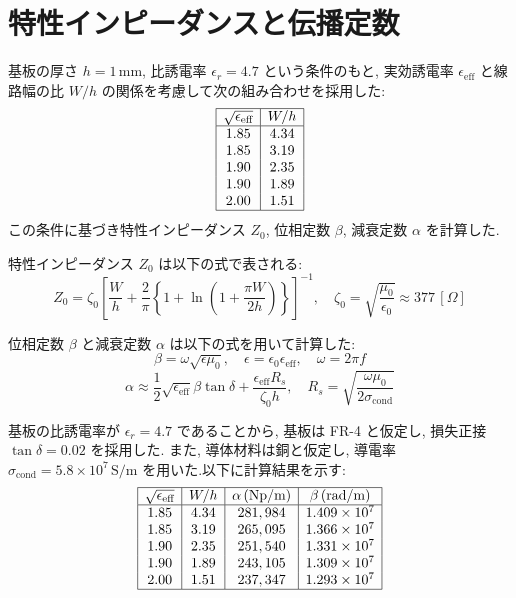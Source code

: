 \documentclass[a4paper, twocolumn]{article} %
\begin{document}
\section{特性インピーダンスと伝播定数}

基板の厚さ \( h = 1 \, \text{mm} \), 比誘電率 \( \epsilon_r = 4.7 \) という条件のもと, 実効誘電率 \(\epsilon_{\text{eff}}\) と線路幅の比 \( W/h \) の関係を考慮して次の組み合わせを採用した:
\[
\begin{array}{|c|c|}
\hline
\sqrt{\epsilon_{\text{eff}}} & W/h \\
\hline
1.85 & 4.34 \\
1.85 & 3.19 \\
1.90 & 2.35 \\
1.90 & 1.89 \\
2.00 & 1.51 \\
\hline
\end{array}
\]
この条件に基づき特性インピーダンス \( Z_0 \), 位相定数 \(\beta\), 減衰定数 \(\alpha\) を計算した.

特性インピーダンス \( Z_0 \) は以下の式で表される:
\[
Z_0 = \zeta_0 \left[ \frac{W}{h} + \frac{2}{\pi} \left\{ 1 + \ln \left( 1 + \frac{\pi W}{2h} \right) \right\} \right]^{-1}, \quad \zeta_0 = \sqrt{\frac{\mu_0}{\epsilon_0}} \approx 377 \, [\Omega]
\]

位相定数 \(\beta\) と減衰定数 \(\alpha\) は以下の式を用いて計算した:
\[
\beta = \omega \sqrt{\epsilon \mu_0}, \quad \epsilon = \epsilon_0 \epsilon_{\text{eff}}, \quad \omega = 2 \pi f
\]
\[
\alpha \approx \frac{1}{2} \sqrt{\epsilon_{\text{eff}}} \beta \tan \delta + \frac{\epsilon_{\text{eff}} R_s}{\zeta_0 h}, \quad R_s = \sqrt{\frac{\omega \mu_0}{2 \sigma_{\text{cond}}}}
\]

基板の比誘電率が \( \epsilon_r = 4.7 \) であることから, 基板は FR-4 と仮定し, 損失正接 \( \tan\delta = 0.02 \) を採用した. また, 導体材料は銅と仮定し, 導電率 \( \sigma_{\text{cond}} = 5.8 \times 10^7 \, \text{S/m} \) を用いた.以下に計算結果を示す:
\[
\begin{array}{|c|c|c|c|}
\hline
\sqrt{\epsilon_{\text{eff}}} & W/h & \alpha \, (\text{Np/m}) & \beta \, (\text{rad/m}) \\
\hline
1.85 & 4.34 & 281,984 & 1.409 \times 10^7 \\
1.85 & 3.19 & 265,095 & 1.366 \times 10^7 \\
1.90 & 2.35 & 251,540 & 1.331 \times 10^7 \\
1.90 & 1.89 & 243,105 & 1.309 \times 10^7 \\
2.00 & 1.51 & 237,347 & 1.293 \times 10^7 \\
\hline
\end{array}
\]
\end{document}
